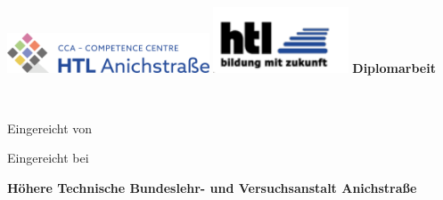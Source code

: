 
\newcommand{\myworktitle}{Diplomarbeit}  %
\newcommand{\myuniversity}{Höhere Technische Bundeslehr- und Versuchsanstalt Anichstraße} %
\newcommand{\mysubmissiontown}{Innsbruck}

\begin{titlepage}

{\sffamily

\begin{center}


\includegraphics[width=60mm]{figures/htl-logo}
\includegraphics[width=40mm]{figures/htl-logo2}
\vfill\vfill\vfill
\vspace{1cm}
{\LARGE\bfseries\myworktitle}

\vfill\vfill\vfill

{\Large\bfseries\mytitle} \\
\mysubtitle

\vfill\vfill\vfill
\vfill\vfill\vfill



\vfill\vfill\vfill

\vspace{1cm}
Eingereicht von

{\bfseries\large\myauthor}
\vfill\vfill\vfill

\vspace{0.5cm}
Eingereicht bei

\vfill

{\bfseries\large\myuniversity}
\vfill

\myinstitute\\

\vfill\vfill\vfill


\end{center}}
\end{titlepage}
